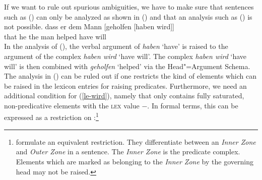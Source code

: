 {{If we want to rule out spurious ambiguities, we have to make sure that sentences such as () can only be analyzed
as shown in () and that an analysis such as () is not possible.
\ea
\label{bsp-non-complex-forming}
\gll dass er dem Mann [geholfen [haben wird]]\\
     that he the man  \spacebr{}helped \spacebr{}have will\\

\z
%
In the analysis of (), the verbal argument of \emph{haben} `have' is raised to the argument
of the complex \emph{haben wird} `have will'.
The complex \emph{haben wird} `have will' is then combined with \emph{geholfen} `helped' via the Head"=Argument Schema. The analysis in ()
can be ruled out if one restricts the kind of elements which can be raised in the lexicon entries for raising predicates.
Furthermore, we need an additional condition for (\ref{le-wird}), namely that  only
contains fully saturated, non-predicative elements with the \textsc{lex} value $-$. In formal terms, this can be expressed as a restriction on :\footnote{%
		\citet{BvN98a} formulate an equivalent restriction. They differentiate between an
		\emph{Inner Zone} and \emph{Outer Zone} in a sentence. The \emph{Inner Zone} 
		is the predicate complex. Elements which are marked as belonging to the \emph{Inner Zone}
		by the governing head may not be raised.

}}}
